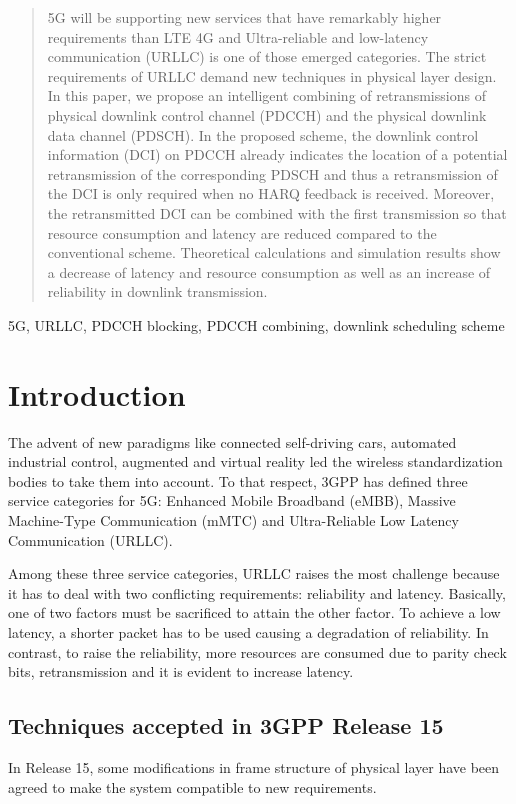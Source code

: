 \documentclass[conference]{IEEEtran}
\begin{document}
\begin{abstract}
5G will be supporting new services that have remarkably higher requirements than LTE 4G and Ultra-reliable and low-latency communication (URLLC) is one of those emerged categories. The strict requirements of URLLC demand new techniques in physical layer design. In this paper, we propose an intelligent combining of retransmissions of physical downlink control channel (PDCCH) and the physical downlink data channel (PDSCH). 
In the proposed scheme, the downlink control information (DCI) on PDCCH already indicates the location of a potential retransmission of the corresponding PDSCH and thus a retransmission of the DCI is only required when no HARQ feedback is received. Moreover, the retransmitted DCI can be combined with the first transmission so that resource consumption and latency are reduced compared to the conventional scheme. 
Theoretical calculations and simulation results show a decrease of latency and resource consumption as well as an increase of reliability in downlink transmission.  
\end{abstract}

\begin{IEEEkeywords}
5G, URLLC, PDCCH blocking, PDCCH combining, downlink scheduling scheme 
\end{IEEEkeywords}

\section{Introduction}
The advent of new paradigms like connected self-driving cars, automated industrial control, augmented and virtual reality led the wireless standardization bodies to take them into account. To that respect, 3GPP has defined three service categories for 5G: Enhanced Mobile Broadband (eMBB), Massive Machine-Type Communication (mMTC) and Ultra-Reliable Low Latency Communication (URLLC). 

Among these three service categories, URLLC raises the most challenge because it has to deal with two conflicting requirements: reliability and latency. Basically, one of two factors must be sacrificed to attain the other factor. To achieve a low latency, a shorter packet has to be used causing a degradation of reliability. In contrast, to raise the reliability, more resources are consumed due to parity check bits, retransmission and it is evident to increase latency.

\subsection{Techniques accepted in 3GPP Release 15}\label{IAA}
In Release 15, some modifications in frame structure of physical layer have been agreed to make the system compatible to new requirements. 
\end{document}
